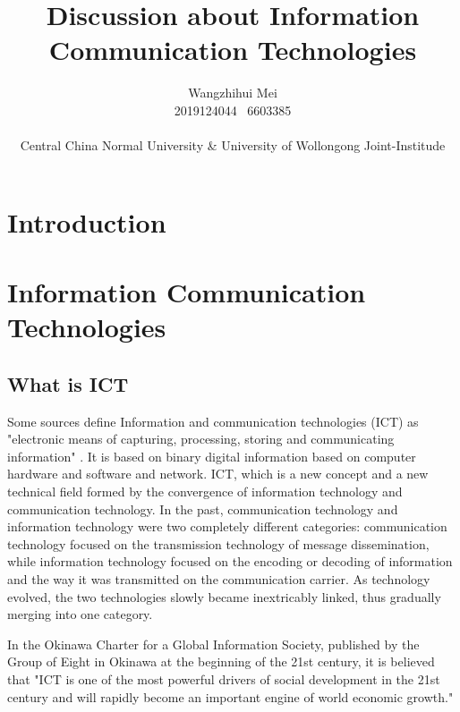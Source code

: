 \documentclass[a4paper,11pt]{article}
\begin{document}
\title{Discussion about Information Communication Technologies}
\author{Wangzhihui Mei \\ 2019124044 \ 6603385
\\ \\
Central China Normal University \& 
University of Wollongong Joint-Institude}


\date{}

\maketitle
\thispagestyle{empty}
\clearpage


\newpage
\setcounter{page}{1} %
\setlength{\parindent}{2em} %
\section{Introduction}

\section{Information Communication Technologies}
\subsection{What is ICT}

Some sources define Information and communication technologies (ICT) as "electronic means of capturing, processing, storing and communicating information" \cite{heeks1999information}. It is based on binary digital information based on computer hardware and software and network. ICT, which is a new concept and a new technical field formed by the convergence of information technology and communication technology. In the past, communication technology and information technology were two completely different categories: communication technology focused on the transmission technology of message dissemination, while information technology focused on the encoding or decoding of information and the way it was transmitted on the communication carrier. As technology evolved, the two technologies slowly became inextricably linked, thus gradually merging into one category.

In the Okinawa Charter for a Global Information Society, published by the Group of Eight in Okinawa at the beginning of the 21st century, it is believed that "ICT is one of the most powerful drivers of social development in the 21st century and will rapidly become an important engine of world economic growth."
\end{document}
